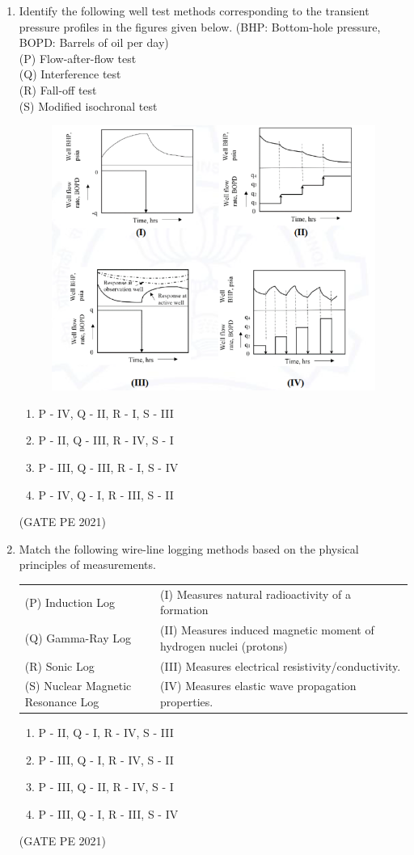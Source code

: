\documentclass[journal,12pt,onecolumn]{IEEEtran}
\theoremstyle{remark}
\begin{document}
\begin{enumerate}
\item Identify the following well test methods corresponding to the transient pressure profiles in the figures given below. (BHP: Bottom-hole pressure, BOPD: Barrels of oil per day)\\

(P) Flow-after-flow test\\
(Q) Interference test\\
(R) Fall-off test\\
(S) Modified isochronal test\\
\begin{figure}[h]
    \centering
    \includegraphics[width=0.5\columnwidth]{Q_28.png}
    \caption{}
    \label{fig:placeholder}
\end{figure}
\begin{enumerate}
    \item P - IV, Q - II, R - I, S - III
    \item P - II, Q - III, R - IV, S - I
    \item P - III, Q - III, R - I, S - IV
    \item P - IV, Q - I, R - III, S - II
\end{enumerate}
\hfill{(GATE PE 2021)}

\item Match the following wire-line logging methods based on the physical principles of measurements.\\
\begin{tabular}{ll}
(P) Induction Log & (I) Measures natural radioactivity of a formation\\
(Q) Gamma-Ray Log & (II) Measures induced magnetic moment of hydrogen nuclei (protons)\\
(R) Sonic Log & (III) Measures electrical resistivity/conductivity. \\
(S) Nuclear Magnetic Resonance Log & (IV) Measures elastic wave propagation properties. \\
\end{tabular}
\begin{enumerate}
    \item P - II, Q - I, R - IV, S - III \\
    \item P - III, Q - I, R - IV, S - II \\
    \item P - III, Q - II, R - IV, S - I \\
    \item P - III, Q - I, R - III, S - IV
\end{enumerate}
\hfill{(GATE PE 2021)}


\end{enumerate}
\end{document}
